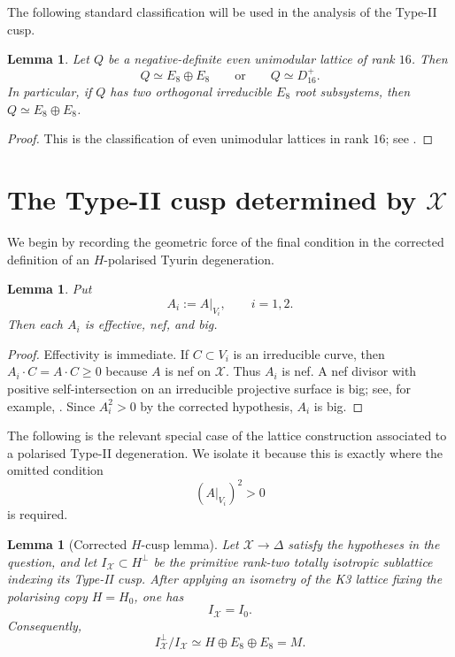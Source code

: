 \documentclass[11pt]{amsart}
\newtheorem{lemma}[theorem]{Lemma}
\theoremstyle{definition}
\newcommand{\cX}{\mathcal X}
\newcommand{\DD}{\Delta}
\begin{document}
The following standard classification will be used in the analysis of the
Type-II cusp.

\begin{lemma}\label{lem:rank16-classification}
Let $Q$ be a negative-definite even unimodular lattice of rank $16$.  Then
\[
Q\simeq E_8\oplus E_8
\qquad\text{or}\qquad
Q\simeq D_{16}^{+}.
\]
In particular, if $Q$ has two orthogonal irreducible $E_8$ root subsystems,
then $Q\simeq E_8\oplus E_8$.
\end{lemma}

\begin{proof}
This is the classification of even unimodular lattices in rank $16$; see
\cite[Chapter~16]{CS99}.
\end{proof}

\section{The Type-II cusp determined by \texorpdfstring{$\cX$}{X}}

We begin by recording the geometric force of the final condition in the
corrected definition of an $H$-polarised Tyurin degeneration.

\begin{lemma}\label{lem:component-positivity}
Put
\[
A_i:=A|_{V_i},\qquad i=1,2.
\]
Then each $A_i$ is effective, nef, and big.
\end{lemma}

\begin{proof}
Effectivity is immediate.  If $C\subset V_i$ is an irreducible curve, then
$A_i\cdot C=A\cdot C\geq 0$ because $A$ is nef on $\cX$.  Thus $A_i$ is nef.
A nef divisor with positive self-intersection on an irreducible projective
surface is big; see, for example, \cite[Theorem~2.2.16]{Laz04}.  Since
$A_i^2>0$ by the corrected hypothesis, $A_i$ is big.
\end{proof}

The following is the relevant special case of the lattice construction
associated to a polarised Type-II degeneration.  We isolate it because this is
exactly where the omitted condition
\[
(A|_{V_i})^2>0
\]
is required.

\begin{lemma}[Corrected $H$-cusp lemma]\label{lem:corrected-cusp}
Let $\cX\to\DD$ satisfy the hypotheses in the question, and let
$I_{\cX}\subset H^\perp$ be the primitive rank-two totally isotropic
sublattice indexing its Type-II cusp.  After applying an isometry of the K3
lattice fixing the polarising copy $H=H_0$, one has
\[
I_{\cX}=I_0.
\]
Consequently,
\begin{equation}\label{eq:mirror-quotient}
I_{\cX}^{\perp}/I_{\cX}\simeq H\oplus E_8\oplus E_8=M.
\end{equation}
\end{lemma}
\end{document}
